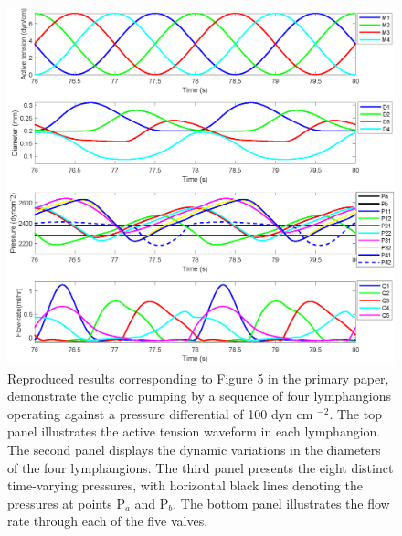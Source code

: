 \documentclass[fleqn,10pt]{physiome}
\begin{document}
\begin{figure}[p]\centering
\includegraphics[trim=1.25cm 5.0cm 0.0cm 0.0cm, clip=true, totalheight=0.75\textheight, ]{figure_3_reproduced.png}
\caption{Reproduced results corresponding to Figure 5 in the primary paper, demonstrate the cyclic pumping by a sequence of four lymphangions operating against a pressure differential of 100 dyn cm $^{-2}$. The top panel illustrates the active tension waveform in each lymphangion. The second panel displays the dynamic variations in the diameters of the four lymphangions. The third panel presents the eight distinct time-varying pressures, with horizontal black lines denoting the pressures at points P$_{a}$ and P$_{b}$. The bottom panel illustrates the flow rate through each of the five valves.}
\label{fig:reproduced_2}
\end{figure}
\end{document}
